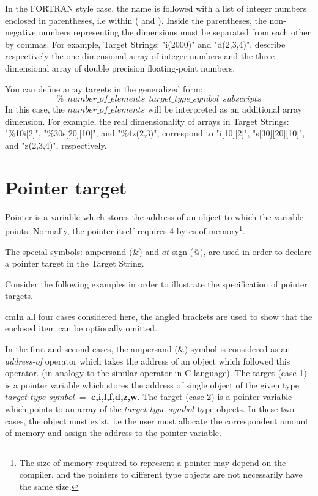 In the FORTRAN style case, the name is followed with 
a list of integer numbers enclosed in parentheses, i.e within ( and ). 
Inside the parentheses, the non-negative numbers representing 
the dimensions must be separated from each other by commas.
For example,  Target Strings: "i(2000)" and "d(2,3,4)", describe
respectively the one dimensional array of integer numbers
and the three dimensional array of double precision floating-point numbers.

You can define array targets in the generalized form:
$$ \%\ \ number\_of\_elements\ \ target\_type\_symbol\ \ subscripts$$
In this case, the $number\_of\_elements$ will be interpreted
as an additional array dimension.
For example, the real dimensionality of arrays in Target Strings:
"\%10i[2]", "\%30s[20][10]", and "\%4z(2,3)",
correspond to "i[10][2]", "s[30][20][10]", and "z(2,3,4)",
respectively.

\section*{Pointer target}

Pointer is a variable which stores the address
of an object to which the variable points.
Normally, the pointer itself requires  4 bytes of memory\footnote{
The size of memory required to represent a pointer
may depend on the compiler,
and the pointers to different type objects
are not necessarily have the same size.
}.

The special symbols: ampersand (\&) and $at$ sign (@),
are used in order to declare a pointer target in the Target String.

Consider the following examples in order to illustrate
the  specification of  pointer targets.


{
{ cm}In all four cases considered here, 
the angled brackets are used to show that the enclosed
item can be optionally omitted.
}

In the first and second cases, the ampersand (\&) symbol is considered as 
an {\it address-of} operator which takes the address of an object
which followed this operator.
(in analogy to the similar operator in C language).
The target (case 1) is a pointer variable
which stores the address of single object
of the given type $target\_type\_symbol\ =$ {\bf c,i,l,f,d,z,w}.
The target (case 2) is a pointer variable
which points to an array of the $target\_type\_symbol$ type objects.
In these two cases, the object must exist, 
i.e the user must allocate the correspondent amount of memory
and assign the address to the pointer variable.


